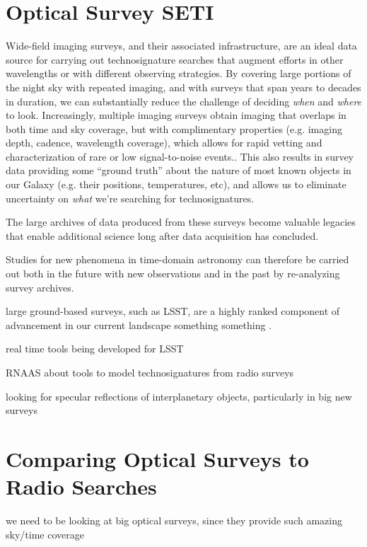 \documentclass[twocolumn]{aastex62}
\begin{document}
\section{Optical Survey SETI}
\label{sec:method}

Wide-field imaging surveys, and their associated infrastructure, are an ideal data source for carrying out technosignature searches that augment efforts in other wavelengths or with different observing strategies. 
By covering large portions of the night sky with repeated imaging, and with surveys that span years to decades in duration, we can substantially reduce the challenge of deciding {\it when} and {\it where} to look. 
Increasingly, multiple imaging surveys obtain imaging that overlaps in both time and sky coverage, but with complimentary properties (e.g. imaging depth, cadence, wavelength coverage), which allows for rapid vetting and characterization of rare or low signal-to-noise events.. This also results in survey data providing some ``ground truth'' about the nature of most known objects in our Galaxy (e.g. their positions, temperatures, etc), and allows us to eliminate uncertainty on {\it what} we're searching for technosignatures.

The large archives of data produced from these surveys become valuable legacies that enable additional science long after data acquisition has concluded. 

Studies for new phenomena in time-domain astronomy can therefore be carried out both in the future with new observations and in the past by re-analyzing survey archives. 




large ground-based surveys, such as LSST, are a highly ranked component of advancement in our current landscape something something
\citep{astro2010}.

real time tools being developed for LSST \citep{schwamb2019}


RNAAS about tools to model technosignatures from radio surveys
\citep{forgan2019}

\citep{lacki2019} looking for specular reflections of interplanetary objects, particularly in big new surveys


\section{Comparing Optical Surveys to Radio Searches}
\label{sec:haystack}
we need to be looking at big optical surveys, since they provide such amazing sky/time coverage
\end{document}
